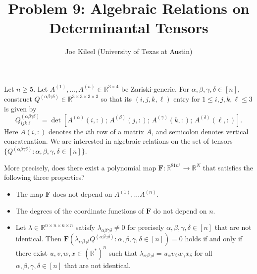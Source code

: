 

\title{Problem 9: Algebraic Relations on Determinantal Tensors}
\author{Joe Kileel (University of Texas at Austin)}
\date{}


\maketitle

Let $n \geq 5$.
Let $A^{(1)}, \ldots, A^{(n)} \in \mathbb{R}^{3 \times 4}$ be Zariski-generic.
For $\alpha, \beta, \gamma, \delta \in [n]$, construct $Q^{(\alpha \beta \gamma \delta)} \in \mathbb{R}^{3 \times 3 \times 3 \times 3}$ so that its $(i, j, k, \ell)$ entry for $1 \leq i, j, k, \ell \leq 3$ is given by
\[
Q^{(\alpha \beta \gamma \delta)}_{i j k \ell} = \det [A^{(\alpha)}(i, :);\, A^{(\beta)}(j, :);\, A^{(\gamma)}(k, :);\, A^{(\delta)}(\ell, :)].
\]
Here $A(i, :)$ denotes the $i$th row of a matrix $A$, and semicolon denotes vertical concatenation. We are interested in algebraic relations on the set of tensors $\{Q^{(\alpha \beta \gamma \delta)} : \alpha, \beta, \gamma, \delta \in [n] \}$.

More precisely, does there exist a polynomial map $\mathbf{F}: \mathbb{R}^{81n^4} \rightarrow \mathbb{R}^N$ that satisfies the following three properties?

\begin{itemize}\setlength\itemsep{0.5em}
\item The map $\mathbf{F}$ does not depend on $A^{(1)}, \ldots A^{(n)}$.
\item The degrees of the coordinate functions of $\mathbf{F}$ do not depend on $n$.
\item Let $\lambda \in \mathbb{R}^{n \times n \times n \times n}$ satisfy $\lambda_{\alpha \beta \gamma \delta} \neq 0$ for precisely $\alpha, \beta, \gamma, \delta \in [n]$ that are not identical.  Then $\mathbf{F}(\lambda_{\alpha \beta \gamma \delta} Q^{(\alpha \beta \gamma \delta)} : \alpha, \beta, \gamma, \delta \in [n]) = 0$ holds if and only if there exist $u, v, w, x \in (\mathbb{R}^*)^n$ such that $\lambda_{\alpha \beta \gamma \delta} = u_{\alpha} v_{\beta} w_{\gamma} x_{\delta}$ for all $\alpha, \beta, \gamma, \delta \in [n]$ that are not identical.
\end{itemize}


